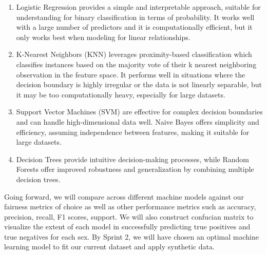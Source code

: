 \documentclass[12pt]{article}
\begin{document}
\begin{enumerate}
\def\labelenumi{\arabic{enumi}.}
\item
  Logistic Regression provides a simple and interpretable approach,
  suitable for understanding for binary classification in terms of
  probability. It works well with a large number of predictors and it is
  computationally efficient, but it only works best when modeling for
  linear relationships.
\item
  K-Nearest Neighbors (KNN) leverages proximity-based classification
  which classifies instances based on the majority vote of their k
  nearest neighboring observation in the feature space. It performs well
  in situations where the decision boundary is highly irregular or the
  data is not linearly separable, but it may be too computationally
  heavy, especially for large datasets.
\item
  Support Vector Machines (SVM) are effective for complex decision
  boundaries and can handle high-dimensional data well. Naive Bayes
  offers simplicity and efficiency, assuming independence between
  features, making it suitable for large datasets.
\item
  Decision Trees provide intuitive decision-making processes, while
  Random Forests offer improved robustness and generalization by
  combining multiple decision trees.
\end{enumerate}

Going forward, we will compare across different machine models against
our fairness metrics of choice as well as other performance metrics such
as accuracy, precision, recall, F1 scores, support. We will also
construct confucian matrix to visualize the extent of each model in
successfully predicting true positives and true negatives for each sex.
By Sprint 2, we will have chosen an optimal machine learning model to
fit our current dataset and apply synthetic data.



\end{document}
